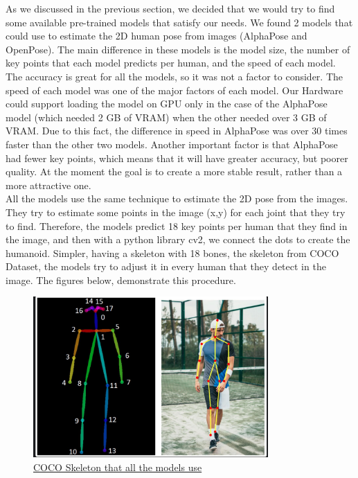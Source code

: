 As we discussed in the previous section, we decided that we would try to find some available pre-trained models that satisfy our needs. We found 2 models that could use to estimate the 2D human pose from images (AlphaPose and OpenPose). The main difference in these models is the model size, the number of key points that each model predicts per human, and the speed of each model. The accuracy is great for all the models, so it was not a factor to consider. The speed of each model was one of the major factors of each model. Our Hardware could support loading the model on GPU only in the case of the AlphaPose model (which needed 2 GB of VRAM) when the other needed over 3 GB of VRAM. Due to this fact, the difference in speed in AlphaPose was over 30 times faster than the other two models. Another important factor is that AlphaPose had fewer key points, which means that it will have greater accuracy, but poorer quality. At the moment the goal is to create a more stable result, rather than a more attractive one.\\

All the models use the same technique to estimate the 2D pose from the images. They try to estimate some points in the image (x,y) for each joint that they try to find. Therefore, the models predict 18 key points per human that they find in the image, and then with a python library cv2, we connect the dots to create the humanoid. Simpler, having a skeleton with 18 bones, the skeleton from COCO Dataset, the models try to adjust it in every human that they detect in the image. The figures below, demonstrate this procedure.

\begin{figure}[h]
	\centering
	\includegraphics[width=0.8\textwidth]{figures/Implementation/skeleton.png}
	\captionsetup{labelformat=empty}
	\caption{\href{https://i.stack.imgur.com/sdwNy.jpg}
	{COCO Skeleton that all the models use}}
\end{figure}

